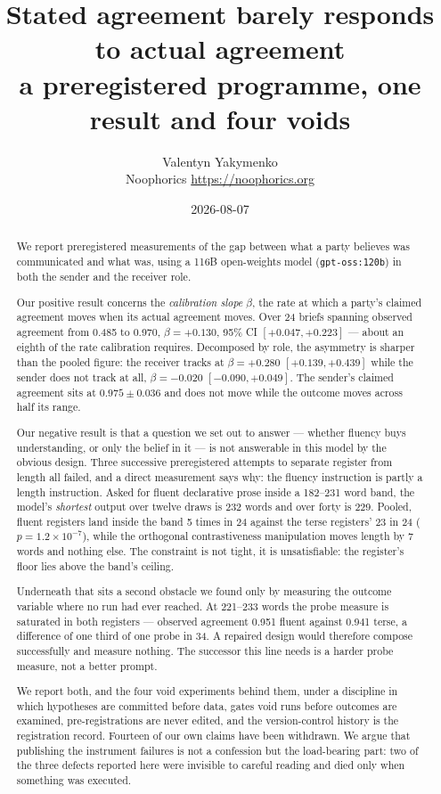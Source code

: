 \documentclass[11pt]{article}
\title{Stated agreement barely responds to actual agreement\\
\large a preregistered programme, one result and four voids}
\author{Valentyn Yakymenko\\
\small Noophorics \quad \url{https://noophorics.org}}
\date{2026-08-07}
\begin{document}
\maketitle

\begin{abstract}
We report preregistered measurements of the gap between what a party believes
was communicated and what was, using a 116B open-weights model
(\texttt{gpt-oss:120b}) in both the sender and the receiver role.

Our positive result concerns the \emph{calibration slope} $\beta$, the rate at
which a party's claimed agreement moves when its actual agreement moves. Over 24
briefs spanning observed agreement from 0.485 to 0.970, $\beta = +0.130$, 95\%
CI $[+0.047, +0.223]$ --- about an eighth of the rate calibration requires.
Decomposed by role, the asymmetry is sharper than the pooled figure: the
receiver tracks at $\beta = +0.280$ $[+0.139, +0.439]$ while the sender does not
track at all, $\beta = -0.020$ $[-0.090, +0.049]$. The sender's claimed
agreement sits at $0.975 \pm 0.036$ and does not move while the outcome moves
across half its range.

Our negative result is that a question we set out to answer --- whether fluency
buys understanding, or only the belief in it --- is not answerable in this model
by the obvious design. Three successive preregistered attempts to separate
register from length all failed, and a direct measurement says why: the fluency
instruction is partly a length instruction. Asked for fluent declarative prose
inside a 182--231 word band, the model's \emph{shortest} output over twelve
draws is 232 words and over forty is 229. Pooled, fluent registers land inside
the band 5 times in 24 against the terse registers' 23 in 24
($p = 1.2\times10^{-7}$), while the orthogonal contrastiveness manipulation moves
length by 7 words and nothing else. The constraint is not tight, it is
unsatisfiable: the register's floor lies above the band's ceiling.

Underneath that sits a second obstacle we found only by measuring the outcome
variable where no run had ever reached. At 221--233 words the probe measure is
saturated in both registers --- observed agreement 0.951 fluent against 0.941
terse, a difference of one third of one probe in 34. A repaired design would
therefore compose successfully and measure nothing. The successor this line needs
is a harder probe measure, not a better prompt.

We report both, and the four void experiments behind them, under a discipline in
which hypotheses are committed before data, gates void runs before outcomes are
examined, pre-registrations are never edited, and the version-control history is
the registration record. Fourteen of our own claims have been withdrawn. We argue
that publishing the instrument failures is not a confession but the load-bearing
part: two of the three defects reported here were invisible to careful reading
and died only when something was executed.
\end{abstract}
\end{document}

